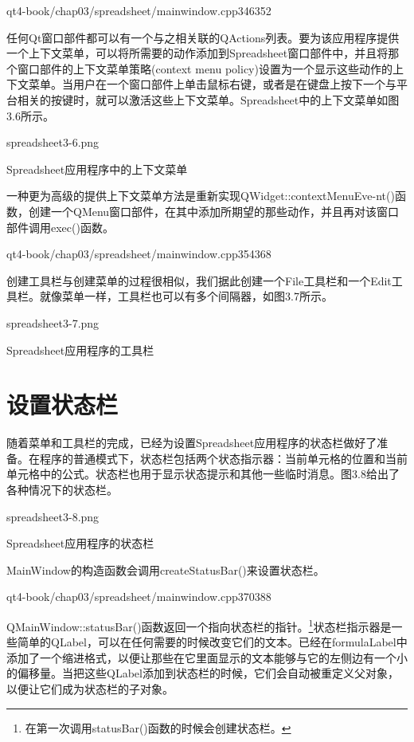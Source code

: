 \documentclass[11pt,oneside]{book}
\begin{document}
\begin{common-format}
\begin{cppline}{qt4-book/chap03/spreadsheet/mainwindow.cpp}{346}{352}
\end{cppline}

任何Qt窗口部件都可以有一个与之相关联的QActions列表。要为该应用程序提供一个上下文菜单，可以将所需要的动作添加到Spreadsheet窗口部件中，并且将那个窗口部件的上下文菜单策略(context menu policy)设置为一个显示这些动作的上下文菜单。当用户在一个窗口部件上单击鼠标右键，或者是在键盘上按下一个与平台相关的按键时，就可以激活这些上下文菜单。Spreadsheet中的上下文菜单如图3.6所示。
\begin{fig}[0.6]{spreadsheet3-6.png}
\caption{Spreadsheet应用程序中的上下文菜单}
\label{fig:spreadsheet3-6.png}
\end{fig}

一种更为高级的提供上下文菜单方法是重新实现QWidget::contextMenuEve-nt()函数，创建一个QMenu窗口部件，在其中添加所期望的那些动作，并且再对该窗口部件调用exec()函数。
\begin{cppline}{qt4-book/chap03/spreadsheet/mainwindow.cpp}{354}{368}
\end{cppline}

创建工具栏与创建菜单的过程很相似，我们据此创建一个File工具栏和一个Edit工具栏。就像菜单一样，工具栏也可以有多个间隔器，如图3.7所示。
\begin{linefig}[0.6]{spreadsheet3-7.png}
\caption{Spreadsheet应用程序的工具栏}
\label{fig:spreadsheet3-7.png}
\end{linefig}


\section{设置状态栏}
随着菜单和工具栏的完成，已经为设置Spreadsheet应用程序的状态栏做好了准备。在程序的普通模式下，状态栏包括两个状态指示器：当前单元格的位置和当前单元格中的公式。状态栏也用于显示状态提示和其他一些临时消息。图3.8给出了各种情况下的状态栏。
\begin{linefig}[0.7]{spreadsheet3-8.png}
\caption{Spreadsheet应用程序的状态栏}
\label{fig:spreadsheet3-8.png}
\end{linefig}

MainWindow的构造函数会调用createStatusBar()来设置状态栏。
\begin{cppline}{qt4-book/chap03/spreadsheet/mainwindow.cpp}{370}{388}
\end{cppline}

QMainWindow::statusBar()函数返回一个指向状态栏的指针。\footnote{在第一次调用statusBar()函数的时候会创建状态栏。}状态栏指示器是一些简单的QLabel，可以在任何需要的时候改变它们的文本。已经在formulaLabel中添加了一个缩进格式，以便让那些在它里面显示的文本能够与它的左侧边有一个小的偏移量。当把这些QLabel添加到状态栏的时候，它们会自动被重定义父对象，以便让它们成为状态栏的子对象。


\end{common-format}
\end{document}
